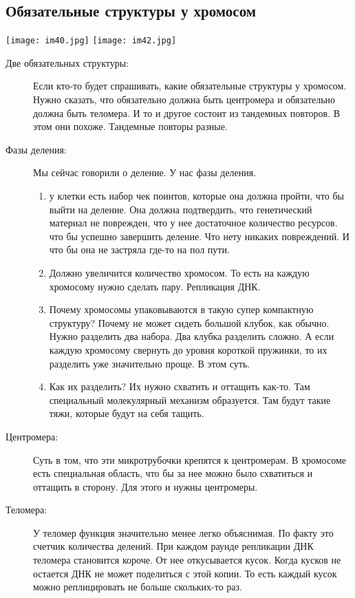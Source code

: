\subsection{Обязательные структуры у хромосом}
\texttt{[image: im40.jpg]}
\texttt{[image: im42.jpg]}
\begin{description}
\item[Две обязательных структуры:]
Если кто-то будет спрашивать, какие обязательные структуры у хромосом. Нужно 
сказать, что обязательно должна быть центромера и обязательно 
должна быть теломера. И то и другое состоит из тандемных повторов. В этом 
они похоже. Тандемные повторы разные. 

\item[Фазы деления:]
Мы сейчас говорили о деление. У нас фазы деления. 
\begin{enumerate}
\item у клетки есть набор чек поинтов,
которые она должна пройти, что бы выйти на деление.
Она должна подтвердить, что
генетический материал не поврежден,
что у нее достаточное количество ресурсов.
что бы успешно завершить деление. Что
нету никаких повреждений. И что бы она не застряла где-то на
пол пути.
\item Должно увеличится количество хромосом. То есть на
каждую хромосому нужно сделать пару. Репликация ДНК.
\item Почему хромосомы упаковываются в такую супер компактную структуру?
Почему не может сидеть большой клубок, как обычно.
Нужно разделить два набора. Два клубка
разделить сложно. А если каждую хромосому свернуть
до уровня короткой пружинки, то
их разделить уже значительно проще.
В этом суть.
\item Как их разделить? Их нужно схватить и оттащить
как-то. Там специальный молекулярный механизм образуется.
Там будут такие тяжи, которые будут на себя тащить.
\end{enumerate}

\item[Центромера:]
Суть в том, что эти микротрубочки крепятся к
центромерам. В хромосоме есть
специальная область, что бы за нее можно
было схватиться и оттащить в сторону.
Для этого и нужны центромеры.

\item[Теломера:]
У теломер функция значительно менее легко объяснимая.
По факту это счетчик количества делений.
При каждом раунде репликации ДНК теломера становится
короче. От нее откусывается кусок. Когда
кусков не остается ДНК не может поделиться с этой копии.
То есть каждый кусок можно
реплицировать не больше скольких-то раз.


\end{description}
